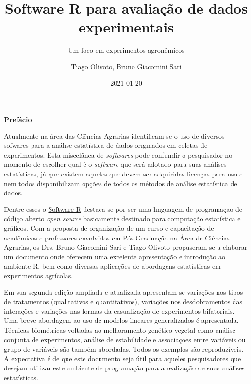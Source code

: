 \documentclass[
]{book}
\title{Software R para avaliação de dados experimentais}
\subtitle{Um foco em experimentos agronômicos}
\author{Tiago Olivoto, Bruno Giacomini Sari}
\date{2021-01-20}
\numberwithin{equation}{section}
\begin{document}
\maketitle

\begin{titlepage}

\end{titlepage}

\newpage
\thispagestyle{empty}



    \begin{center}
    
    \textbf{\LARGE
    Prefácio
    }
    
    \end{center}
    
    \vspace{1cm}

\large

Atualmente na área das Ciências Agrárias identificam-se o uso de diversos sofwares para a análise estatística de dados originados em coletas de experimentos. Esta miscelânea de \textit{softwares} pode confundir o pesquisador no momento de escolher qual é o \textit{software} que será adotado para suas análises estatísticas, já que existem aqueles que devem ser adquiridas licenças para uso e nem todos disponibilizam opções de todos os métodos de análise estatística de dados.


Dentre esses o \href{https://www.r-project.org/}{Software R} destaca-se por ser uma linguagem de programação de código aberto \textit{open source} basicamente destinado para computação estatística e gráficos. Com a proposta de organização de um curso e capacitação de acadêmicos e professores envolvidos em Pós-Graduação na Área de Ciências Agrárias, os Drs. Bruno Giacomini Sari e Tiago Olivoto propuseram-se a elaborar um documento onde oferecem uma excelente apresentação e introdução ao ambiente R, bem como diversas aplicações de abordagens estatísticas em experimentos agrícolas. 


Em sua segunda edição ampliada e atualizada apresentam-se variações nos tipos de tratamentos (qualitativos e quantitativos), variações nos desdobramentos das interações e variações nas formas da casualização de experimentos bifatoriais. Uma breve abordagem ao uso de modelos lineares generalizados é apresentada. Técnicas biométricas voltadas ao melhoramento genético vegetal como análise conjunta de experimentos, análise de estabilidade e associações entre variáveis ou grupo de variáveis são também abordadas. Todos os exemplos são reproduzíveis. A expectativa é de que este documento seja útil para aqueles pesquisadores que desejam utilizar este ambiente de programação para a realização de suas análises estatísticas.
\end{document}
